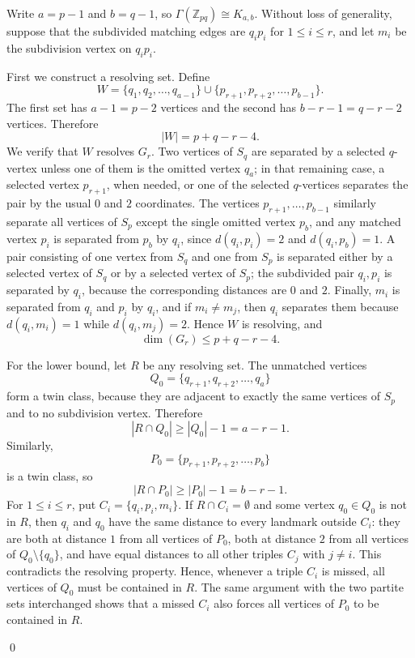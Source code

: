 \documentclass[12pt]{article}
\renewenvironment{proof}{{\bf \noindent Proof.}}{\qed}
\begin{document}
\begin{proof}
Write $a=p-1$ and $b=q-1$, so $\Gamma(\mathbb Z_{pq})\cong K_{a,b}$. Without loss of generality, suppose that the subdivided matching edges are $q_ip_i$ for $1\leq i\leq r$, and let $m_i$ be the subdivision vertex on $q_ip_i$.

First we construct a resolving set. Define
$$
W=\{q_1,q_2,\ldots,q_{a-1}\}\cup\{p_{r+1},p_{r+2},\ldots,p_{b-1}\}.
$$
The first set has $a-1=p-2$ vertices and the second has $b-r-1=q-r-2$ vertices. Therefore
$$
|W|=p+q-r-4.
$$
We verify that $W$ resolves $G_r$. Two vertices of $S_q$ are separated by a selected $q$-vertex unless one of them is the omitted vertex $q_a$; in that remaining case, a selected vertex $p_{r+1}$, when needed, or one of the selected $q$-vertices separates the pair by the usual $0$ and $2$ coordinates. The vertices $p_{r+1},\ldots,p_{b-1}$ similarly separate all vertices of $S_p$ except the single omitted vertex $p_b$, and any matched vertex $p_i$ is separated from $p_b$ by $q_i$, since $d(q_i,p_i)=2$ and $d(q_i,p_b)=1$. A pair consisting of one vertex from $S_q$ and one from $S_p$ is separated either by a selected vertex of $S_q$ or by a selected vertex of $S_p$; the subdivided pair $q_i,p_i$ is separated by $q_i$, because the corresponding distances are $0$ and $2$. Finally, $m_i$ is separated from $q_i$ and $p_i$ by $q_i$, and if $m_i\neq m_j$, then $q_i$ separates them because $d(q_i,m_i)=1$ while $d(q_i,m_j)=2$. Hence $W$ is resolving, and
$$
\dim(G_r)\leq p+q-r-4.
$$

For the lower bound, let $R$ be any resolving set. The unmatched vertices
$$
Q_0=\{q_{r+1},q_{r+2},\ldots,q_a\}
$$
form a twin class, because they are adjacent to exactly the same vertices of $S_p$ and to no subdivision vertex. Therefore
$$
|R\cap Q_0|\geq |Q_0|-1=a-r-1.
$$
Similarly,
$$
P_0=\{p_{r+1},p_{r+2},\ldots,p_b\}
$$
is a twin class, so
$$
|R\cap P_0|\geq |P_0|-1=b-r-1.
$$
For $1\leq i\leq r$, put $C_i=\{q_i,p_i,m_i\}$. If $R\cap C_i=\emptyset$ and some vertex $q_0\in Q_0$ is not in $R$, then $q_i$ and $q_0$ have the same distance to every landmark outside $C_i$: they are both at distance $1$ from all vertices of $P_0$, both at distance $2$ from all vertices of $Q_0\setminus\{q_0\}$, and have equal distances to all other triples $C_j$ with $j\neq i$. This contradicts the resolving property. Hence, whenever a triple $C_i$ is missed, all vertices of $Q_0$ must be contained in $R$. The same argument with the two partite sets interchanged shows that a missed $C_i$ also forces all vertices of $P_0$ to be contained in $R$.


\end{proof}
\end{document}
